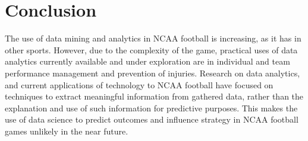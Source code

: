 \documentclass[sigconf]{acmart}
\begin{document}
\section{Conclusion}
The use of data mining and analytics in NCAA football is increasing, as it has in other sports. However, due to the complexity of the game, practical uses of data analytics currently available and under exploration are in individual and team performance management and prevention of injuries. Research on data analytics, and current applications of technology to NCAA football have focused on techniques to extract meaningful information from gathered data, rather than the explanation and use of such information for predictive purposes. This makes the use of data science to predict outcomes and influence strategy in NCAA football games unlikely in the near future.


 
\end{document}
